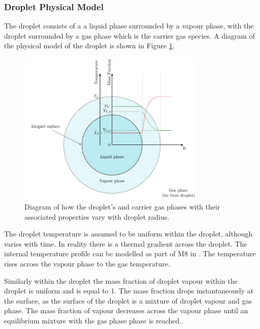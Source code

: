 \documentclass[../Interim_Report_Master]{subfiles}
\begin{document}
\subsubsection{Droplet Physical Model}
The droplet consists of a a liquid phase surrounded by a vapour phase, with the droplet surrounded by a gas phase which is the carrier gas species. A diagram of the physical model of the droplet is shown in Figure \ref{drop_diag}.
\begin{figure}[h]
	\centering
	\includegraphics[width=0.8\textwidth]{./Diagrams/Droplet_Diagram/Droplet_Diagram.pdf}
	\caption{Diagram of how the droplet's and carrier gas phases with their associated properties vary with droplet radius.}
	\label{drop_diag}
\end{figure}

The droplet temperature is assumed to be uniform within the droplet, although varies with time. In reality there is a thermal gradient across the droplet. The internal temperature profile can be modelled as part of M8 in \cite{Miller1998}. The temperature rises across the vapour phase to the gas temperature. 

Similarly within the droplet the mass fraction of droplet vapour within the droplet is uniform and is equal to 1. The mass fraction drops instantaneously at the surface, as the surface of the droplet is a mixture of droplet vapour and gas phase. The mass fraction of vapour decreases across the vapour phase until an equilibrium mixture with the gas phase phase is reached.\cite{pinheiro_vedovoto_2018}.
\end{document}
